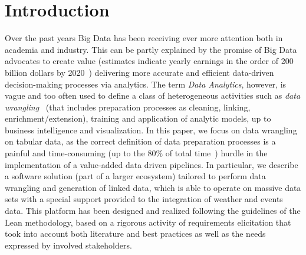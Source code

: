 \section{Introduction}



Over the past years Big Data has been receiving ever more attention both in academia and industry. 
This can be partly explained by the promise of Big Data advocates to create value (estimates indicate yearly earnings in the order of 200 billion dollars by 2020~\cite{idc_analytics}) delivering more accurate and efficient data-driven decision-making processes via analytics. 
The term \textit{Data Analytics}, however, is vague and too often used to define a class of heterogeneous activities such as \textit{data wrangling}~\cite{furche2016data} (that includes preparation processes as cleaning, linking, enrichment/extension), training and application of analytic models, up to business intelligence and visualization. 
In this paper, we focus on data wrangling on tabular data, as the correct definition of data preparation processes is a painful and time-consuming (up to the 80\% of total time~\cite{lohr2014big}) hurdle in the implementation of a value-added data driven pipelines.
In particular, we describe a software solution (part of a larger ecosystem) tailored to perform data wrangling and generation of linked data, which is able to operate on massive data sets with a special support provided to the integration of weather and events data. This platform has been designed and realized following the guidelines of the Lean methodology, based on a rigorous activity of requirements elicitation that took into account both literature and best practices as well as the needs expressed by involved stakeholders. 


